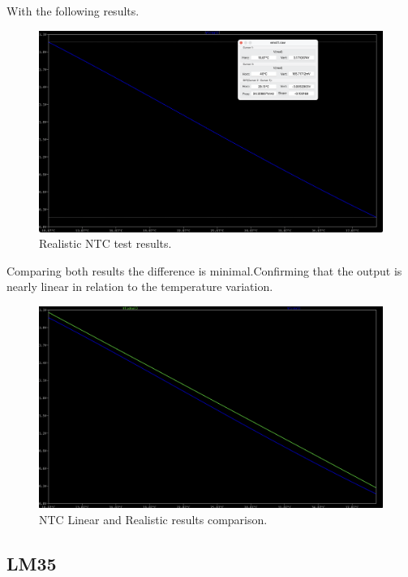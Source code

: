 \documentclass[12pt]{article}
\begin{document}
    With the following results.
    
    \begin{figure}[H] 
        \centering
        \includegraphics*[scale = 0.3]{images/NTCRealRes.png}
        \caption{Realistic NTC test results.}
        \label{wrap-fig:1}
    \end{figure}

    Comparing both results the difference is minimal.Confirming that the output is nearly linear in relation to the temperature variation.
    
    \begin{figure}[H] 
        \centering
        \includegraphics*[scale = 0.3]{images/NTCRealLinearComp.png}
        \caption{NTC Linear and Realistic results comparison.}
        \label{wrap-fig:1}
    \end{figure}


\subsection{LM35}
\end{document}

